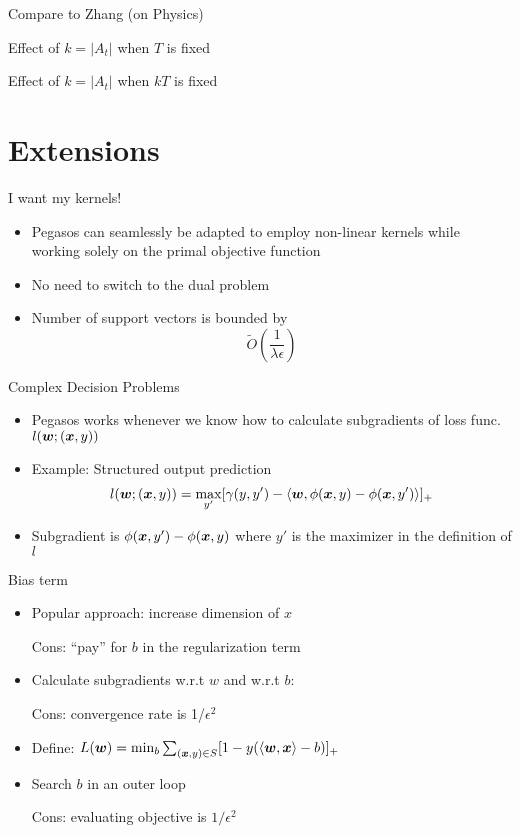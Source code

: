 \begin{frame}{Compare to Zhang (on Physics)}
\end{frame}

\begin{frame}{Effect of $k=|A_t|$ when $T$ is fixed}
\end{frame}

\begin{frame}{Effect of $k=|A_t|$ when $kT$ is fixed}
\end{frame}

\section{Extensions}
\begin{frame}{I want my kernels!}
\begin{itemize}
    \item Pegasos can seamlessly be adapted to employ non-linear kernels while working solely on the primal objective function
    \item No need to switch to the dual problem
    \item Number of support vectors is bounded by 
        \[
            \tilde{O}(\frac{1}{\lambda \epsilon})
        \]
\end{itemize}
\end{frame}

\begin{frame}{Complex Decision Problems}
\begin{itemize}
    \item Pegasos works whenever we know how to calculate subgradients of loss func. $l(\bm{w};(\bm{x},y))$
    \item Example: Structured output prediction
        \[
            l(\bm{w};(\bm{x},y)) = \max_{y'}[\gamma(y,y')-\langle \bm{w}, \phi(\bm{x},y)- \phi(\bm{x},y')\rangle]_+
        \]
    \item Subgradient is $\phi(\bm{x},y')-\phi(\bm{x},y)$ where $y'$ is the maximizer in the definition of $l$
\end{itemize}
\end{frame}

\begin{frame}{Bias term}
    \begin{itemize}
        \item Popular approach: increase dimension of $x$

            {\color{green}Cons: ``pay'' for $b$ in the regularization term}
        \item Calculate subgradients w.r.t $w$ and w.r.t $b$:

            {\color{green}Cons: convergence rate is 1/$\epsilon^2$}
        \item Define: $L(\bm{w}) = \min_b \sum_{(\bm{x},y)\in S} [1-y(\langle \bm{w}, \bm{x}\rangle - b)]_+$
        \item Search $b$ in an outer loop

            {\color{green}Cons: evaluating objective is $1/\epsilon^2$}
    \end{itemize}
\end{frame}

